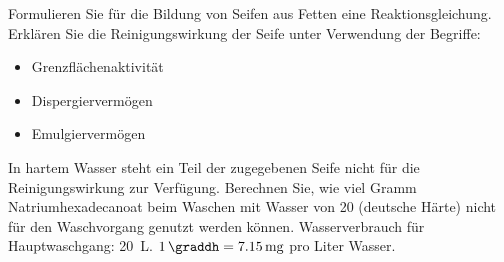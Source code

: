 \documentclass{scrartcl}
\begin{document}
\begin{question}[name=Verseifung und deutsche Härte]
  \begin{tasks}
    \task Formulieren Sie für die Bildung von Seifen aus Fetten eine
      Reaktionsgleichung.
    \task Erklären Sie die Reinigungswirkung der Seife unter Verwendung der
      Begriffe:
      \begin{itemize}
        \item Grenzflächenaktivität
        \item Dispergiervermögen
        \item Emulgiervermögen
     \end{itemize}
    \task In hartem Wasser steht ein Teil der zugegebenen Seife nicht für die
      Reinigungswirkung zur Verfügung.  Berechnen Sie, wie viel Gramm
      Natriumhexadecanoat beim Waschen mit Wasser von \SI{20}{\graddh}
      (deutsche Härte) nicht für den Waschvorgang genutzt werden können.
      Wasserverbrauch für Hauptwaschgang: \SI{20}{\liter}.  $\SI{1}{\graddh} =
      \SI{7.15}{\milli\gram}$  pro Liter Wasser.
  \end{tasks}
\end{question}
\end{document}
